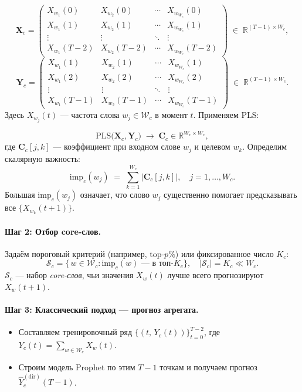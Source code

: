 \documentclass[14pt,a4paper]{article}
\begin{document}
\[
  \mathbf{X}_c 
  = 
  \begin{pmatrix}
    X_{w_1}(0) & X_{w_2}(0) & \cdots & X_{w_{W_c}}(0) \\
    X_{w_1}(1) & X_{w_2}(1) & \cdots & X_{w_{W_c}}(1) \\
    \vdots     & \vdots     & \ddots & \vdots       \\
    X_{w_1}(T-2) & X_{w_2}(T-2) & \cdots & X_{w_{W_c}}(T-2)
  \end{pmatrix}
  \;\in\;\mathbb{R}^{(T-1)\times W_c},
\]
\[
  \mathbf{Y}_c 
  = 
  \begin{pmatrix}
    X_{w_1}(1) & X_{w_2}(1) & \cdots & X_{w_{W_c}}(1) \\
    X_{w_1}(2) & X_{w_2}(2) & \cdots & X_{w_{W_c}}(2) \\
    \vdots     & \vdots     & \ddots & \vdots       \\
    X_{w_1}(T-1) & X_{w_2}(T-1) & \cdots & X_{w_{W_c}}(T-1)
  \end{pmatrix}
  \;\in\;\mathbb{R}^{(T-1)\times W_c}.
\]
Здесь \(X_{w_j}(t)\) — частота слова \(w_j\in \mathcal W_c\) в момент \(t\). Применяем PLS:

\[
  \mathrm{PLS}\bigl(\mathbf{X}_c,\mathbf{Y}_c\bigr) \;\longrightarrow\; \mathbf{C}_c \in \mathbb{R}^{W_c \times W_c},
\]
где \(\mathbf{C}_c[j,k]\) — коэффициент при входном слове \(w_j\) и целевом \(w_k\). 
Определим скалярную важность:
\[
  \mathrm{imp}_c(w_j)
  \;=\;
  \sum_{k=1}^{W_c} \bigl|\mathbf{C}_c[j,k]\bigr|,
  \quad j=1,\dots,W_c.
\]
Большая \(\mathrm{imp}_c(w_j)\) означает, что слово \(w_j\) существенно помогает предсказывать все \(\{X_{w_k}(t+1)\}\).

\paragraph{Шаг 2: Отбор core-слов.}

Задаём пороговый критерий (например, top-\(p\%\)) или фиксированное число \(K_c\):
\[
  \mathcal S_c 
  = 
  \bigl\{\,w\in\mathcal W_c : \mathrm{imp}_c(w)\text{ — в топ-}K_c\bigr\},
  \quad
  |\mathcal S_c| = K_c \ll W_c.
\]
\(\mathcal S_c\) — набор \emph{core-слов}, чьи значения \(X_w(t)\) лучше всего прогнозируют \(X_w(t+1)\).

\paragraph{Шаг 3: Классический подход — прогноз агрегата.}

\begin{itemize}
  \item Составляем тренировочный ряд \(\{(t,\,Y_c(t))\}_{t=0}^{T-2}\), где 
  \(Y_c(t)=\sum_{w\in\mathcal W_c} X_w(t)\).
  \item Строим модель Prophet по этим \(T-1\) точкам и получаем прогноз 
    \(\widehat{Y}_c^{(\mathrm{dir})}(T-1)\).
\end{itemize}
\end{document}
